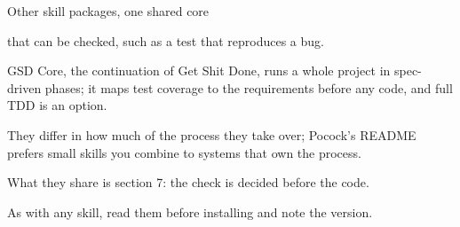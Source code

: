 \begin{frame}[source={GitHub, 3 Nov 2026: obra/superpowers v7.0.1 · multica-ai/andrej-karpathy-skills · open-gsd/gsd-core v1.20.0 · mattpocock/skills v1.3.1}]{Other skill packages, one shared core}
{      that can be checked, such as a test that reproduces a bug.\par
    GSD Core, the continuation of Get Shit Done, runs a whole project in spec-driven phases; it
      maps test coverage to the requirements before any code, and full TDD is an option.\par
    They differ in how much of the process they take over; Pocock's README prefers small skills
      you combine to systems that own the process.\par
    What they share is section 7: the check is decided before the code.\par
    As with any skill, read them before installing and note the version.}
\end{frame}

